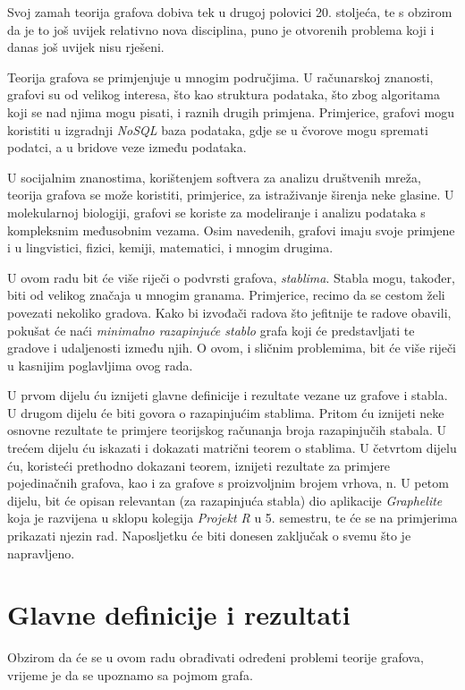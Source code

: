 \documentclass[times, utf8, zavrsni]{fer}
\begin{document}
Svoj zamah teorija grafova dobiva tek u drugoj polovici 20. stoljeća, te s obzirom da je to još uvijek relativno nova disciplina, puno je otvorenih problema koji i danas još uvijek nisu rješeni.

Teorija grafova se primjenjuje u mnogim područjima. U računarskoj znanosti, grafovi su od velikog interesa, što kao struktura podataka, što zbog algoritama koji se nad njima mogu pisati, i raznih drugih primjena. Primjerice, grafovi mogu koristiti u izgradnji \textit{NoSQL} baza podataka, gdje se u čvorove mogu spremati podatci, a u bridove veze između podataka.

U socijalnim znanostima, korištenjem softvera za analizu društvenih mreža, teorija grafova se može koristiti, primjerice, za istraživanje širenja neke glasine. U molekularnoj biologiji, grafovi se koriste za modeliranje i analizu podataka s kompleksnim međusobnim vezama. Osim navedenih, grafovi imaju svoje primjene i u lingvistici, fizici, kemiji, matematici, i mnogim drugima.

U ovom radu bit će više riječi o podvrsti grafova, \textit{stablima}. Stabla mogu, također, biti od velikog značaja u mnogim granama. Primjerice, recimo da se cestom želi povezati nekoliko gradova. Kako bi izvođači radova što jefitnije te radove obavili, pokušat će naći \textit{minimalno razapinjuće stablo} grafa koji će predstavljati te gradove i udaljenosti između njih. O ovom, i sličnim problemima, bit će više riječi u kasnijim poglavljima ovog rada.

U prvom dijelu ću iznijeti glavne definicije i rezultate vezane uz grafove i stabla. U drugom dijelu će biti govora o razapinjućim stablima. Pritom ću iznijeti neke osnovne rezultate te primjere teorijskog računanja broja razapinjučih stabala. 
U trećem dijelu ću iskazati i dokazati matrični teorem o stablima.
U četvrtom dijelu ću, koristeći prethodno dokazani teorem, iznijeti rezultate za primjere pojedinačnih grafova, kao i za grafove s proizvoljnim brojem vrhova, n. U petom dijelu, bit će opisan relevantan (za razapinjuća stabla) dio aplikacije \textit{Graphelite} koja je razvijena u sklopu kolegija \textit{Projekt R} u 5. semestru, te će se na primjerima prikazati njezin rad. Naposljetku će biti donesen zaključak o svemu što je napravljeno.

\chapter{Glavne definicije i rezultati}

Obzirom da će se u ovom radu obrađivati određeni problemi teorije grafova, vrijeme je da se upoznamo sa pojmom grafa.
\end{document}
